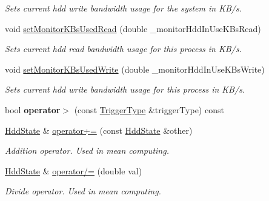 \begin{DoxyCompactItemize}
\begin{DoxyCompactList}\small\item\em Sets current hdd write bandwidth usage for the system in K\+B/s. \end{DoxyCompactList}\item 
void \hyperlink{classHddState_a577573f55afe777aff67c4fd07ddd6d8}{set\+Monitor\+K\+Bs\+Used\+Read} (double \+\_\+monitor\+Hdd\+In\+Use\+K\+Bs\+Read)\hypertarget{classHddState_a577573f55afe777aff67c4fd07ddd6d8}{}\label{classHddState_a577573f55afe777aff67c4fd07ddd6d8}

\begin{DoxyCompactList}\small\item\em Sets current hdd read bandwidth usage for this process in K\+B/s. \end{DoxyCompactList}\item 
void \hyperlink{classHddState_a4daae6dc429d04daee5b3332909ae001}{set\+Monitor\+K\+Bs\+Used\+Write} (double \+\_\+monitor\+Hdd\+In\+Use\+K\+Bs\+Write)\hypertarget{classHddState_a4daae6dc429d04daee5b3332909ae001}{}\label{classHddState_a4daae6dc429d04daee5b3332909ae001}

\begin{DoxyCompactList}\small\item\em Sets current hdd write bandwidth usage for this process in K\+B/s. \end{DoxyCompactList}\item 
bool {\bfseries operator$>$} (const \hyperlink{structTriggerType}{Trigger\+Type} \&trigger\+Type) const \hypertarget{classHddState_a6de8b96115f4b7cae9cab8c87a98aadd}{}\label{classHddState_a6de8b96115f4b7cae9cab8c87a98aadd}

\item 
\hyperlink{classHddState}{Hdd\+State} \& \hyperlink{classHddState_a19295031a2c076b9f02c40c3a3ae2319}{operator+=} (const \hyperlink{classHddState}{Hdd\+State} \&other)\hypertarget{classHddState_a19295031a2c076b9f02c40c3a3ae2319}{}\label{classHddState_a19295031a2c076b9f02c40c3a3ae2319}

\begin{DoxyCompactList}\small\item\em Addition operator. Used in mean computing. \end{DoxyCompactList}\item 
\hyperlink{classHddState}{Hdd\+State} \& \hyperlink{classHddState_af2c42584f8d88f34860677da7b73a460}{operator/=} (double val)\hypertarget{classHddState_af2c42584f8d88f34860677da7b73a460}{}\label{classHddState_af2c42584f8d88f34860677da7b73a460}

\begin{DoxyCompactList}\small\item\em Divide operator. Used in mean computing. \end{DoxyCompactList}\end{DoxyCompactItemize}
